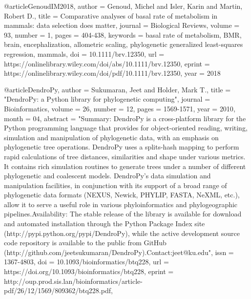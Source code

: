 @article{GenoudIM2018,
author = {Genoud, Michel and Isler, Karin and Martin, Robert D.},
title = {Comparative analyses of basal rate of metabolism in mammals: data selection does matter},
journal = {Biological Reviews},
volume = {93},
number = {1},
pages = {404-438},
keywords = {basal rate of metabolism, BMR, brain, encephalization, allometric scaling, phylogenetic generalized least-squares regression, mammals},
doi = {10.1111/brv.12350},
url = {https://onlinelibrary.wiley.com/doi/abs/10.1111/brv.12350},
eprint = {https://onlinelibrary.wiley.com/doi/pdf/10.1111/brv.12350},
year = {2018}
}


@article{DendroPy,
    author = {Sukumaran, Jeet and Holder, Mark T.},
    title = "{DendroPy: a Python library for phylogenetic computing}",
    journal = {Bioinformatics},
    volume = {26},
    number = {12},
    pages = {1569-1571},
    year = {2010},
    month = {04},
    abstract = "{Summary: DendroPy is a cross-platform library for the Python programming language that provides for object-oriented reading, writing, simulation and manipulation of phylogenetic data, with an emphasis on phylogenetic tree operations. DendroPy uses a splits-hash mapping to perform rapid calculations of tree distances, similarities and shape under various metrics. It contains rich simulation routines to generate trees under a number of different phylogenetic and coalescent models. DendroPy's data simulation and manipulation facilities, in conjunction with its support of a broad range of phylogenetic data formats (NEXUS, Newick, PHYLIP, FASTA, NeXML, etc.), allow it to serve a useful role in various phyloinformatics and phylogeographic pipelines.Availability: The stable release of the library is available for download and automated installation through the Python Package Index site (http://pypi.python.org/pypi/DendroPy), while the active development source code repository is available to the public from GitHub (http://github.com/jeetsukumaran/DendroPy).Contact:jeet@ku.edu}",
    issn = {1367-4803},
    doi = {10.1093/bioinformatics/btq228},
    url = {https://doi.org/10.1093/bioinformatics/btq228},
    eprint = {http://oup.prod.sis.lan/bioinformatics/article-pdf/26/12/1569/809362/btq228.pdf},
}


